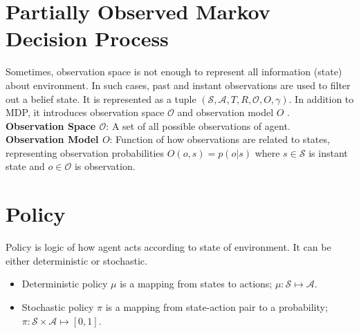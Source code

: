\section{Partially Observed Markov Decision Process}
\label{sec:pomdp}
Sometimes, observation space is not enough to represent all information (state) about environment. In such cases, past and instant observations are used to filter out a belief state. It is represented as a tuple $(\mathcal{S},\mathcal{A},T,R,\mathcal{O},O,\gamma)$. In addition to MDP, it introduces observation space $\mathcal{O}$ and observation model $O$ \cite{francois-lavet_introduction_2018}. \\
\textbf{Observation Space $\mathcal{O}$}: A set of all possible observations of agent. \\
\textbf{Observation Model $O$}: Function of how observations are related to states, representing observation probabilities $O(o,s) = p(o|s)$ where $s \in \mathcal{S}$ is instant state and $o \in \mathcal{O}$ is observation. \\ 
\section{Policy}
Policy is logic of how agent acts according to state of environment. It can be either deterministic or stochastic. \\
\begin{itemize}
	\item Deterministic policy $\mu$ is a mapping from states to actions; $\mu \colon \mathcal{S} \mapsto \mathcal{A}$.
	\item Stochastic policy $\pi$ is a mapping from state-action pair to a probability; $\pi \colon \mathcal{S} \times \mathcal{A} \mapsto [0,1]$.
\end{itemize}
